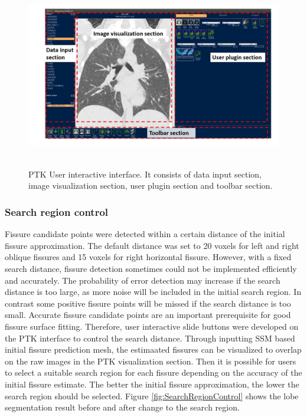 {\begin{figure}[htbp]
  \flushleft 
  \includegraphics[height=3.2in]{Segmentation/Image/PTKUserInterface.jpg}
  \caption{PTK User interactive interface. It consists of data input section, image visualization section, user plugin section and toolbar section.}
  \label{fig:PTKUserInterface}
\end{figure}

\subsubsection{Search region control}
Fissure candidate points were detected within a certain distance of the initial fissure approximation. The default distance was set to 20 voxels for left and right oblique fissures and 15 voxels for right horizontal fissure. However, with a fixed search distance, fissure detection sometimes could not be implemented efficiently and accurately. The probability of error detection may increase if the search distance is too large, as more noise will be included in the initial search region. In contrast some positive fissure points will be missed if the search distance is too small. Accurate fissure candidate points are an important prerequisite for good fissure surface fitting. Therefore, user interactive slide buttons were developed on the PTK interface to control the search distance. Through inputting SSM based initial fissure prediction mesh, the estimaated fissures can be  visualized to overlap on the raw images in the PTK visualization section. Then it is possible for users to select a suitable search region for each fissure depending on the accuracy of the initial fissure estimate. The better the initial fissure approximation, the lower the search region should be selected. Figure \ref{fig:SearchRegionControl} shows the lobe segmentation result before and after change to the search region.

}
